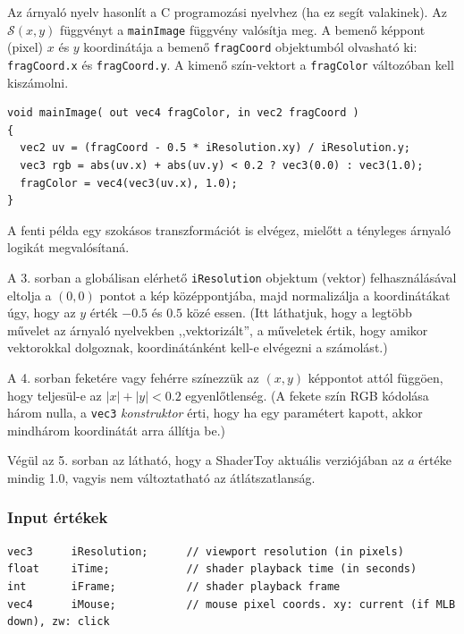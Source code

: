 Az árnyaló nyelv hasonlít a C programozási nyelvhez (ha ez segít valakinek). Az $\mathcal{S}(x,y)$
függvényt a \texttt{mainImage} függvény valósítja meg. A bemenő képpont (pixel) $x$ és $y$ koordinátája
a bemenő \texttt{fragCoord} objektumból olvasható ki: \texttt{fragCoord.x} és \texttt{fragCoord.y}.
A kimenő szín-vektort a \texttt{fragColor} változóban kell kiszámolni.

\begin{tcolorbox}[colback=yellow!5,colframe=yellow!50!black,title=Példa: ferde négyzetet rajzoló árnyaló]
\begin{verbatim}
void mainImage( out vec4 fragColor, in vec2 fragCoord )
{
  vec2 uv = (fragCoord - 0.5 * iResolution.xy) / iResolution.y;
  vec3 rgb = abs(uv.x) + abs(uv.y) < 0.2 ? vec3(0.0) : vec3(1.0);
  fragColor = vec4(vec3(uv.x), 1.0);
}
\end{verbatim}  
\end{tcolorbox}

A fenti példa egy szokásos transzformációt is elvégez, mielőtt a tényleges árnyaló logikát megvalósítaná.

A 3. sorban a globálisan elérhető \texttt{iResolution} objektum (vektor) felhasználásával eltolja a $(0, 0)$ pontot
a kép középpontjába, majd normalizálja a koordinátákat úgy, hogy az $y$ érték $-0.5$ és $0.5$ közé essen.
(Itt láthatjuk, hogy a legtöbb művelet az árnyaló nyelvekben ,,vektorizált'', a műveletek értik, hogy amikor
vektorokkal dolgoznak, koordinátánként kell-e elvégezni a számolást.)

A 4. sorban feketére vagy fehérre színezzük az $(x, y)$ képpontot attól függöen, hogy teljesül-e
az $|x|+|y| < 0.2$ egyenlőtlenség. (A fekete szín RGB kódolása három nulla, a \texttt{vec3} \emph{konstruktor}
érti, hogy ha egy paramétert kapott, akkor mindhárom koordinátát arra állítja be.)

Végül az 5. sorban az látható, hogy a ShaderToy aktuális verziójában az $a$ értéke mindig 1.0, vagyis
nem változtatható az átlátszatlanság.


\subsubsection{Input értékek}

\begin{tcolorbox}[colback=yellow!5,colframe=yellow!50!black,title=Néhány ShaderToy input változó]
\begin{verbatim}
vec3      iResolution;      // viewport resolution (in pixels)
float     iTime;            // shader playback time (in seconds)
int       iFrame;           // shader playback frame
vec4      iMouse;           // mouse pixel coords. xy: current (if MLB down), zw: click
\end{verbatim}  
\end{tcolorbox}
  

